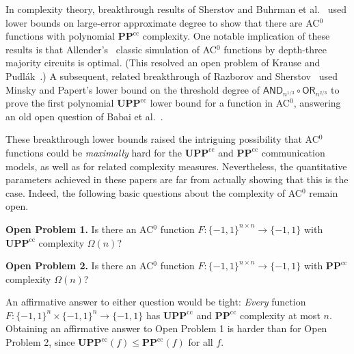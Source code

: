 \documentclass[11pt]{article}
\numberwithin{equation}{section}
\theoremstyle{definition}
\theoremstyle{plain}
\newcommand{\OR}{\mathsf{ OR}}
\newcommand{\bits}{\{-1,1\}}
\newcommand{\PP}{\mathbf{PP}}
\newcommand{\UPP}{\mathbf{UPP}}
\newcommand{\UPPcc}{\mathbf{UPP}^{\text{cc}}}
\newcommand{\AND}{\mathsf{AND}}
\begin{document}
In complexity theory, breakthrough results
of Sherstov \cite{sherstovmajmaj, patmat} and Buhrman et al.~\cite{bvdw}
used lower bounds on large-error approximate degree
to show that there are AC$^0$ functions with polynomial $\PP^{\text{cc}}$
complexity. 
One notable implication  of these results is that Allender's~\cite{allender} classic simulation
of AC$^0$ functions by depth-three majority circuits is optimal. (This resolved an open problem of Krause and Pudl{\'{a}}k~\cite{kp}.)
A subsequent, related breakthrough of Razborov and Sherstov~\cite{razborovsherstov} used Minsky and Papert's lower bound 
on the threshold degree of $\AND_{n^{1/3}} \circ \OR_{n^{2/3}}$ to prove the first polynomial $\UPPcc$
lower bound for a function in AC$^0$, answering an old open question of Babai et al.~\cite{babaietal}. 

\medskip

These breakthrough  lower bounds raised the intriguing possibility that AC$^0$ functions could be \emph{maximally} hard for
the $\UPP^{\text{cc}}$ and $\PP^{\text{cc}}$ communication models, as well as for related complexity measures. Nevertheless, the quantitative parameters achieved in these %
papers   %
are far from actually showing that this is the case. Indeed, the following basic questions about the complexity of AC$^0$ remain open.

\label{s:openproblem1}

\medskip \noindent \textbf{Open Problem 1.} Is there an AC$^0$ function $F \colon \bits^{n \times n} \to \bits$  with 
$\UPP^{\text{cc}}$ complexity $\Omega(n)$?

\medskip \noindent \textbf{Open Problem 2.} Is there an AC$^0$ function $F \colon \bits^{n \times n} \to \bits$  with 
$\PP^{\text{cc}}$ complexity  $\Omega(n)$?

\medskip 
An affirmative answer to either question would be tight: \emph{Every} function $F \colon \bits^n \times \bits^n \to \bits$
has  $\UPP^{\text{cc}}$ and  $\PP^{\text{cc}}$ complexity at most $n$. %
Obtaining an affirmative answer to Open Problem 1 is
harder than for Open Problem 2, since $\UPP^{\text{cc}}(f) \leq \PP^{\text{cc}}(f)$ for all $f$. 
\end{document}
